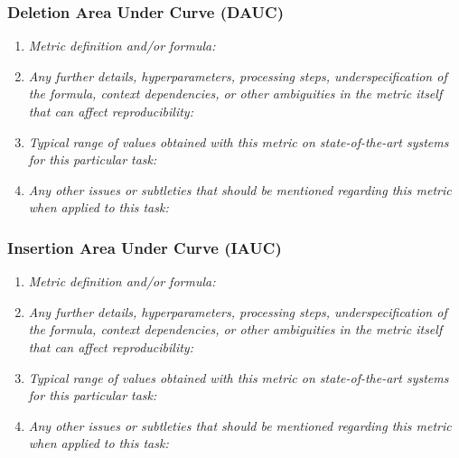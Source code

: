 \documentclass[a4paper,11pt]{article}
\begin{document}
        \subsubsection{Deletion Area Under Curve (DAUC)}
            \begin{enumerate}[label=\alph*.]
                \item \textit{Metric definition and/or formula:}
                \bigskip
                \item \textit{Any further details, hyperparameters, processing steps, underspecification of the formula, context dependencies, or other ambiguities in the metric itself that can affect reproducibility:}
                \bigskip
                \item \textit{Typical range of values obtained with this metric on state-of-the-art systems for this particular task:}
                \bigskip
                \item \textit{Any other issues or subtleties that should be mentioned regarding this metric when applied to this task:}
                \bigskip
            \end{enumerate}
        \subsubsection{Insertion Area Under Curve (IAUC)}
            \begin{enumerate}[label=\alph*.]
                \item \textit{Metric definition and/or formula:}
                \bigskip
                \item \textit{Any further details, hyperparameters, processing steps, underspecification of the formula, context dependencies, or other ambiguities in the metric itself that can affect reproducibility:}
                \bigskip
                \item \textit{Typical range of values obtained with this metric on state-of-the-art systems for this particular task:}
                \bigskip
                \item \textit{Any other issues or subtleties that should be mentioned regarding this metric when applied to this task:}
                \bigskip
            \end{enumerate}
\end{document}
